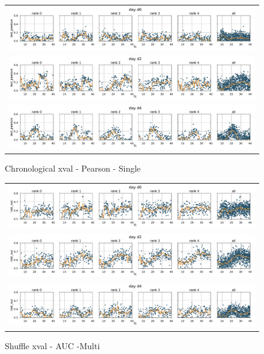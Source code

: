 \documentclass[10pt,a4paper]{article}
\begin{document}
\begin{figure}
\centering
\begin{tabular}{c}
	\includegraphics[width=\perfwidth\textwidth]{figures/par_sweep/test_pearson_fc_d0_Chrono_Single}\\
	\includegraphics[width=\perfwidth\textwidth]{figures/par_sweep/test_pearson_fc_d2_Chrono_Single}\\
	\includegraphics[width=\perfwidth\textwidth]{figures//par_sweep/test_pearson_fc_d4_Chrono_Single}
\end{tabular}
\caption{Chronological xval - Pearson - Single} 
\end{figure}

\begin{figure}
\centering
\begin{tabular}{c}
	\includegraphics[width=\perfwidth\textwidth]{figures/par_sweep/test_auc_fc_d0_Shuffle_Multi}\\
	\includegraphics[width=\perfwidth\textwidth]{figures/par_sweep/test_auc_fc_d2_Shuffle_Multi}\\
	\includegraphics[width=\perfwidth\textwidth]{figures//par_sweep/test_auc_fc_d4_Shuffle_Multi}
\end{tabular}
\caption{Shuffle xval - AUC -Multi } 
\end{figure}
\end{document}
